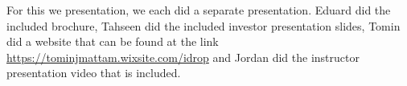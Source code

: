 \documentclass[11pt]{article}
\author{fbi}
\date{\today}
\title{}
\begin{document}
For this we presentation, we each did a separate presentation.
Eduard did the included brochure, Tahseen did the included investor
presentation slides, Tomin did a website that can be found at
the link \href{https://tominjmattam.wixsite.com/idrop}{https://tominjmattam.wixsite.com/idrop} and Jordan did 
the instructor presentation video that is included.
\end{document}
